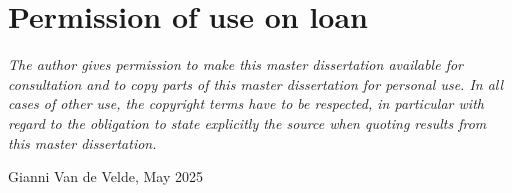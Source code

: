 
\titleformat{\chapter}{}{}{0em}{\bf\Huge}
\chapter*{Permission of use on loan}

\vspace{6cm}


\textit{The author gives permission to make this master dissertation available for consultation and to copy parts of this master dissertation for personal use. In all cases of other use, the copyright terms have to be respected, in particular with regard to the obligation to state explicitly the source when quoting results from this master dissertation.}

\vspace{2cm}

Gianni Van de Velde, May 2025